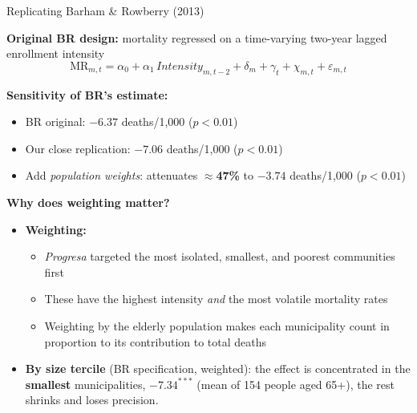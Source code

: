 \documentclass[aspectratio=169,usenames,dvipsnames]{beamer}
\begin{document}
\begin{frame}{Replicating Barham \& Rowberry (2013)}\label{br_replication}
\footnotesize

\textbf{Original BR design:} mortality regressed on a time-varying two-year lagged enrollment intensity
\begin{equation*}
\text{MR}_{m,t} = \alpha_0 + \alpha_1\,\textit{Intensity}_{m,t-2} + \delta_m + \gamma_t + \chi_{m,t} + \varepsilon_{m,t}
\end{equation*}

\textbf{Sensitivity of BR's estimate:}
\begin{itemize}
  \item[\textbf{(A)}] BR original: $-6.37$ deaths/1,000 ($p<0.01$)
  \item[\textbf{(B)}] Our close replication: $-7.06$ deaths/1,000 ($p<0.01$)
  \item[\textbf{(C)}] Add \textit{population weights}: attenuates $\approx$\textbf{47\%} to $-3.74$ deaths/1,000 ($p<0.01$)
\end{itemize}

\vspace{6pt}
\textbf{Why does weighting matter?}
\begin{itemize}
  \item[$\circ$] \textbf{Weighting:} 
  \begin{itemize}
  \item \textit{Progresa} targeted the most isolated, smallest, and poorest communities first
  \item These have the highest intensity \textit{and} the most volatile mortality rates
  \item Weighting by the elderly population makes each municipality count in proportion to its contribution to total deaths
  \end{itemize}
  \item[$\circ$] \textbf{By size tercile} (BR specification, weighted): the effect is concentrated in the \textbf{smallest} municipalities, $-7.34^{***}$ (mean of 154 people aged 65+), the rest shrinks and loses precision.
\end{itemize}
\end{frame}

\end{document}
